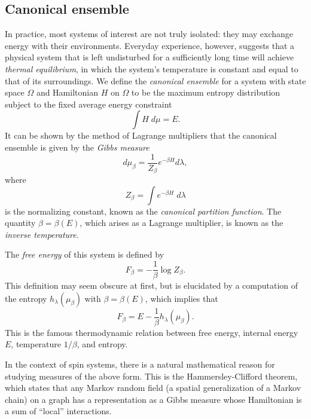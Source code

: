 
\subsection{Canonical ensemble}

In practice, most systems of interest are not truly isolated: they may exchange
energy with their environments. Everyday experience, however, suggests that
a physical system that is left undisturbed for a sufficiently long time will achieve \emph{thermal equilibrium}, in which the system's temperature is constant and equal to that of its surroundings. We define the \emph{canonical ensemble} for a system with state space $\Omega$ and Hamiltonian $H$ on
$\Omega$ to be the maximum entropy distribution subject to the fixed average energy constraint
\begin{equation}
\int H \; d\mu = E.
\end{equation}
It can be shown by the method of Lagrange multipliers that the canonical ensemble is given by the \emph{Gibbs measure}
\begin{equation}
d\mu_\beta = \frac{1}{Z_\beta} e^{-\beta H} d\lambda,
\end{equation}
where
\begin{equation}
Z_\beta = \int e^{-\beta H} \; d\lambda
\end{equation}
is the normalizing constant, known as the \emph{canonical partition function}.
The quantity $\beta = \beta(E)$, which arises as a Lagrange multiplier, is known as the \emph{inverse temperature}.

The \emph{free energy} of this system is defined by
\begin{equation}
F_\beta = -\frac{1}{\beta} \log Z_\beta.
\end{equation}
This definition may seem obscure at first, but is elucidated by a computation of the entropy $h_\lambda(\mu_\beta)$ with $\beta = \beta(E)$, which implies that
\begin{equation}
F_\beta = E - \frac{1}{\beta} h_\lambda(\mu_\beta).
\end{equation}
This is the famous thermodynamic relation between free energy, internal energy $E$, temperature $1/\beta$, and entropy.


In the context of spin systems, there is a natural mathematical reason for studying measures of the above form. This is the Hammersley-Clifford theorem, which states that any Markov random field (a spatial generalization of a Markov chain) on a graph has a representation as a Gibbs measure whose Hamiltonian is a sum of ``local'' interactions.

